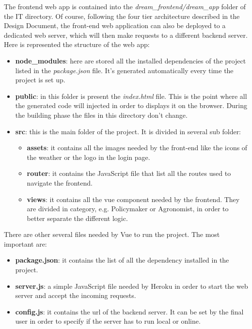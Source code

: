 \documentclass[table, 12pt]{article}
\begin{document}
The frontend web app is contained into the \textit{dream\_frontend/dream\_app} folder of
the IT directory.
Of course, following the four tier architecture described in the Design Document,
the front-end web application can also be deployed to a dedicated web server,
which will then make requests to a different backend server.
Here is represented the structure of the web app:
\begin{itemize}
    \item \textbf{node\_modules}: here are stored all the installed dependencies of the project listed in the \textit{package.json} file.
    It's generated automatically every time the project is set up.
    \item \textbf{public}: in this folder is present the \textit{index.html} file.
    This is the point where all the generated code will injected in order to displays it on the browser.
    During the building phase the files in this directory don't change.
    \item \textbf{src}: this is the main folder of the project. It is divided in several sub folder:
    \begin {itemize}
        \item \textbf{assets}: it contains all the images needed by the front-end like the icons of the weather or the logo in the login page.
        \item \textbf{router}: it contains the JavaScript file that list all the routes used to navigate the frontend.
        \item \textbf{views}: it contains all the vue component needed by the frontend.
        They are divided in category, e.g. Policymaker or Agronomist, in order to better separate the different logic.
    \end{itemize}
\end{itemize}

There are other several files needed by Vue to run the project. The most important are:
\begin{itemize}
    \item \textbf{package.json}: it contains the list of all the dependency installed in the project.
    \item \textbf{server.js}: a simple JavaScript file needed by Heroku in order to start the web server and accept the incoming requests.
    \item \textbf{config.js}: it contains the url of the backend server.
    It can be set by the final user in order to specify if the server has to run local or online.
\end{itemize}
\end{document}
